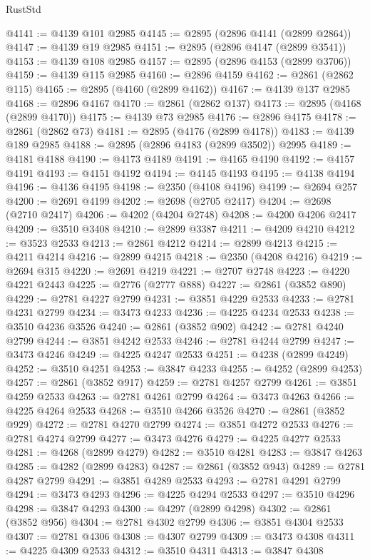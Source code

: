 \begin{lexlean}{RustStd}
\begin{coremodule}
@4141 := @4139 @101 @2985
@4145 := @2895 (@2896 @4141 (@2899 @2864))
@4147 := @4139 @19 @2985
@4151 := @2895 (@2896 @4147 (@2899 @3541))
@4153 := @4139 @108 @2985
@4157 := @2895 (@2896 @4153 (@2899 @3706))
@4159 := @4139 @115 @2985
@4160 := @2896 @4159
@4162 := @2861 (@2862 @115)
@4165 := @2895 (@4160 (@2899 @4162))
@4167 := @4139 @137 @2985
@4168 := @2896 @4167
@4170 := @2861 (@2862 @137)
@4173 := @2895 (@4168 (@2899 @4170))
@4175 := @4139 @73 @2985
@4176 := @2896 @4175
@4178 := @2861 (@2862 @73)
@4181 := @2895 (@4176 (@2899 @4178))
@4183 := @4139 @189 @2985
@4188 := @2895 (@2896 @4183 (@2899 @3502)) @2995
@4189 := @4181 @4188
@4190 := @4173 @4189
@4191 := @4165 @4190
@4192 := @4157 @4191
@4193 := @4151 @4192
@4194 := @4145 @4193
@4195 := @4138 @4194
@4196 := @4136 @4195
@4198 := @2350 (@4108 @4196)
@4199 := @2694 @257
@4200 := @2691 @4199
@4202 := @2698 (@2705 @2417)
@4204 := @2698 (@2710 @2417)
@4206 := @4202 (@4204 @2748)
@4208 := @4200 @4206 @2417
@4209 := @3510 @3408
@4210 := @2899 @3387
@4211 := @4209 @4210
@4212 := @3523 @2533
@4213 := @2861 @4212
@4214 := @2899 @4213
@4215 := @4211 @4214
@4216 := @2899 @4215
@4218 := @2350 (@4208 @4216)
@4219 := @2694 @315
@4220 := @2691 @4219
@4221 := @2707 @2748
@4223 := @4220 @4221 @2443
@4225 := @2776 (@2777 @888)
@4227 := @2861 (@3852 @890)
@4229 := @2781 @4227 @2799
@4231 := @3851 @4229 @2533
@4233 := @2781 @4231 @2799
@4234 := @3473 @4233
@4236 := @4225 @4234 @2533
@4238 := @3510 @4236 @3526
@4240 := @2861 (@3852 @902)
@4242 := @2781 @4240 @2799
@4244 := @3851 @4242 @2533
@4246 := @2781 @4244 @2799
@4247 := @3473 @4246
@4249 := @4225 @4247 @2533
@4251 := @4238 (@2899 @4249)
@4252 := @3510 @4251
@4253 := @3847 @4233
@4255 := @4252 (@2899 @4253)
@4257 := @2861 (@3852 @917)
@4259 := @2781 @4257 @2799
@4261 := @3851 @4259 @2533
@4263 := @2781 @4261 @2799
@4264 := @3473 @4263
@4266 := @4225 @4264 @2533
@4268 := @3510 @4266 @3526
@4270 := @2861 (@3852 @929)
@4272 := @2781 @4270 @2799
@4274 := @3851 @4272 @2533
@4276 := @2781 @4274 @2799
@4277 := @3473 @4276
@4279 := @4225 @4277 @2533
@4281 := @4268 (@2899 @4279)
@4282 := @3510 @4281
@4283 := @3847 @4263
@4285 := @4282 (@2899 @4283)
@4287 := @2861 (@3852 @943)
@4289 := @2781 @4287 @2799
@4291 := @3851 @4289 @2533
@4293 := @2781 @4291 @2799
@4294 := @3473 @4293
@4296 := @4225 @4294 @2533
@4297 := @3510 @4296
@4298 := @3847 @4293
@4300 := @4297 (@2899 @4298)
@4302 := @2861 (@3852 @956)
@4304 := @2781 @4302 @2799
@4306 := @3851 @4304 @2533
@4307 := @2781 @4306
@4308 := @4307 @2799
@4309 := @3473 @4308
@4311 := @4225 @4309 @2533
@4312 := @3510 @4311
@4313 := @3847 @4308

\end{coremodule}
\end{lexlean}
